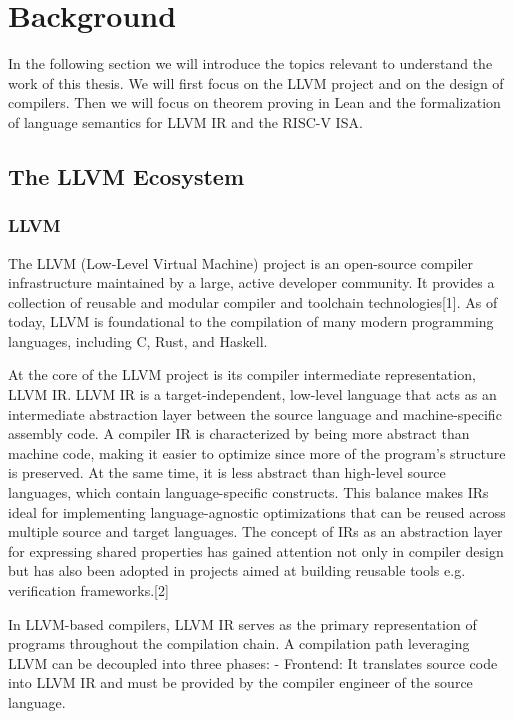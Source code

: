 
\chapter{Background}
In the following section we will introduce the topics relevant to understand the work of this thesis. We will first
focus on the LLVM project and on the design of compilers. Then we will focus on theorem proving in Lean and the formalization of language semantics for LLVM IR and the RISC-V ISA.

\section {The LLVM Ecosystem}
\subsection{ LLVM }
The LLVM (Low-Level Virtual Machine) project is an open-source compiler infrastructure maintained by a large, active developer community. It provides a collection of reusable and modular compiler and toolchain technologies[1].  As of today, LLVM is foundational to the compilation of many modern programming languages, including C, Rust, and Haskell.

At the core of the LLVM project is its compiler intermediate representation, LLVM IR. LLVM IR is a target-independent, low-level language that acts as an intermediate abstraction layer between the source language and machine-specific assembly code. A compiler IR is characterized by being more abstract than machine code, making it easier to optimize since more of the program's structure is preserved. At the same time, it is less abstract than high-level source languages, which contain language-specific constructs.
This balance makes IRs ideal for implementing language-agnostic optimizations that can be reused across multiple source and target languages. The concept of IRs as an abstraction layer for expressing shared properties has gained attention not only in compiler design but has also been adopted in projects aimed at building reusable tools e.g. verification frameworks.[2]

In LLVM-based compilers, LLVM IR serves as the primary  representation of programs throughout the compilation chain. A compilation path leveraging LLVM can be decoupled into three phases:
- Frontend: It translates source code into LLVM IR and must be provided by the compiler engineer of the source language.

